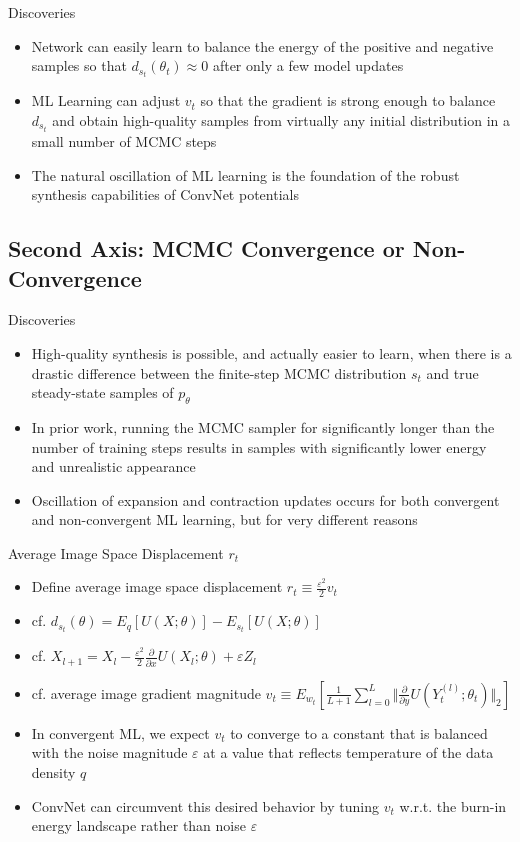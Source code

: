 \documentclass{beamer}
\begin{document}
\begin{frame}{Discoveries}
\begin{itemize}
\item Network can
easily learn to balance the energy of the positive and negative
samples so that $d_{s_t}(\theta_t)\approx 0$ after only a few model
updates
\item ML Learning can adjust $v_t$ so that the gradient is strong enough to balance $d_{s_t}$ and obtain high-quality
samples from virtually any initial distribution in a
small number of MCMC steps
\item The natural oscillation
of ML learning is the foundation of the robust synthesis
capabilities of ConvNet potentials
\end{itemize}
\end{frame}

\subsection{Second Axis: MCMC Convergence or Non-Convergence}
\begin{frame}{Discoveries}
\begin{itemize}
\item High-quality synthesis is possible, and actually easier to
learn, when there is a drastic difference between the finite-step
MCMC distribution $s_t$ and true steady-state samples of $p_\theta$
\item In prior work, running the MCMC
sampler for significantly longer than the number of training
steps results in samples with significantly lower energy
and unrealistic appearance
\item Oscillation of expansion and contraction updates occurs
for both convergent and non-convergent ML learning, but
for very different reasons
\end{itemize}
\end{frame}

\begin{frame}{Average Image Space Displacement $r_t$}
\begin{itemize}
\item Define average image space displacement $r_t\equiv \frac{\varepsilon^2}{2}v_t$
\item cf. $d_{s_t}(\theta)=E_q[U(X;\theta)]-E_{s_t}[U(X;\theta)]$
\item cf. $X_{l+1}=X_l-\frac{\varepsilon^2}{2}\frac{\partial}{\partial x}U(X_l;\theta)+\varepsilon Z_l$
\item cf. average image gradient magnitude $v_t\equiv E_{w_t}[\frac{1}{L+1}\sum_{l=0}^L\Vert\frac{\partial}{\partial y}U(Y_t^{(l)};\theta_t)\Vert_2]$
\item In convergent ML, we expect $v_t$ to converge to a constant that is balanced with the noise magnitude $\varepsilon$ at a value that reflects temperature of the data density $q$
\item ConvNet can circumvent this desired behavior by tuning $v_t$ w.r.t. the burn-in energy landscape rather than noise $\varepsilon$
\end{itemize}
\end{frame}
\end{document}
